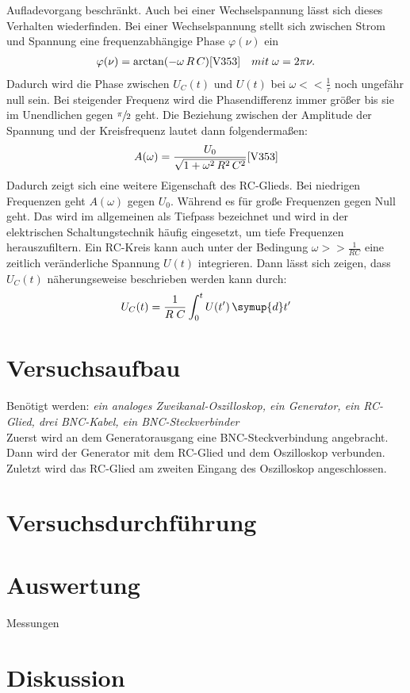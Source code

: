   Aufladevorgang beschränkt. Auch bei einer Wechselspannung lässt sich dieses 
  Verhalten wiederfinden. Bei einer Wechselspannung stellt sich zwischen Strom 
  und Spannung eine frequenzabhängige Phase $\varphi(\nu)$ ein
  \begin{align}
      \varphi(\nu)=\arctan (-\omega \, R\, C) \text{\cite{V353}} \quad mit \; \omega = 2 \pi \nu. \label{eq:nu}
  \end{align}
  Dadurch wird die Phase zwischen $U_C(t)$ und $U(t)$ bei $\omega << \frac{1}{\tau}$
  noch ungefähr null sein. Bei steigender Frequenz wird die Phasendifferenz immer größer
  bis sie im Unendlichen gegen $\sfrac{\pi}{2}$ geht.
  Die Beziehung zwischen der Amplitude der Spannung und der Kreisfrequenz lautet dann 
  folgendermaßen:
  \begin{align}
    A(\omega)= \frac{U_0}{\sqrt{1+\omega^2\, R^2\, C^2}} \text{\cite{V353}} \label{eq:A}
  \end{align}
  Dadurch zeigt sich eine weitere Eigenschaft des RC-Glieds. Bei niedrigen 
  Frequenzen geht $A(\omega)$ gegen $U_0$. Während es für große Frequenzen
  gegen Null geht.
  Das wird im allgemeinen als Tiefpass bezeichnet und  wird in der 
  elektrischen Schaltungstechnik häufig eingesetzt, um tiefe Frequenzen
  herauszufiltern.
  Ein RC-Kreis kann auch unter der Bedingung $\omega >> \frac{1}{RC}$ eine 
  zeitlich veränderliche Spannung $U(t)$ integrieren. Dann lässt sich 
  zeigen, dass $U_C(t)$ näherungseweise beschrieben werden kann durch:
  \begin{align}
    U_C(t)=\frac{1}{R\;C} \int_0^t{U(t')\, \symup{d}t'}
  \end{align}




\section{Versuchsaufbau}
Benötigt werden: \textit{ein analoges Zweikanal-Oszilloskop, ein Generator, ein RC-Glied, drei BNC-Kabel, ein BNC-Steckverbinder }\\
Zuerst wird an dem Generatorausgang eine BNC-Steckverbindung angebracht. 
Dann wird der Generator mit dem RC-Glied und dem Oszilloskop verbunden. \\
Zuletzt wird das RC-Glied am zweiten Eingang des Oszilloskop angeschlossen.
\section{Versuchsdurchführung}

\section{Auswertung}

    \begin{table}
        \centering
        \caption{Messungen}
         
        \label{tab:data}
    \end{table}

\section{Diskussion}
\newpage
\nocite{V353}
\printbibliography
